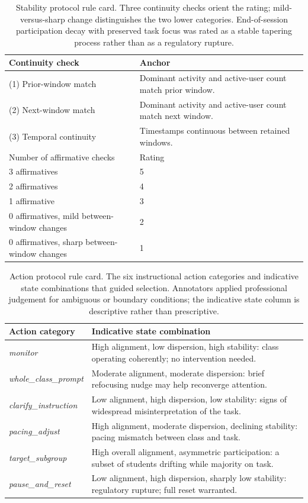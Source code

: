 \documentclass[preprint,12pt,authoryear]{elsarticle}
\begin{document}
\begin{table}[h]
\centering
\caption{Stability protocol rule card. Three continuity checks orient the rating; mild-versus-sharp change distinguishes the two lower categories. End-of-session participation decay with preserved task focus was rated as a stable tapering process rather than as a regulatory rupture.}
\label{tab:annot-stability}
\begin{tabular}{lp{8cm}}
\hline
Continuity check & Anchor \\
\hline
(1) Prior-window match & Dominant activity and active-user count match prior window. \\
(2) Next-window match & Dominant activity and active-user count match next window. \\
(3) Temporal continuity & Timestamps continuous between retained windows. \\
\hline
Number of affirmative checks & Rating \\
\hline
3 affirmatives & 5 \\
2 affirmatives & 4 \\
1 affirmative & 3 \\
0 affirmatives, mild between-window changes & 2 \\
0 affirmatives, sharp between-window changes & 1 \\
\hline
\end{tabular}
\end{table}

\begin{table}[h]
\centering
\caption{Action protocol rule card. The six instructional action categories and indicative state combinations that guided selection. Annotators applied professional judgement for ambiguous or boundary conditions; the indicative state column is descriptive rather than prescriptive.}
\label{tab:annot-action}
\begin{tabular}{lp{7cm}}
\hline
Action category & Indicative state combination \\
\hline
\textit{monitor} & High alignment, low dispersion, high stability: class operating coherently; no intervention needed. \\
\textit{whole\_class\_prompt} & Moderate alignment, moderate dispersion: brief refocusing nudge may help reconverge attention. \\
\textit{clarify\_instruction} & Low alignment, high dispersion, low stability: signs of widespread misinterpretation of the task. \\
\textit{pacing\_adjust} & High alignment, moderate dispersion, declining stability: pacing mismatch between class and task. \\
\textit{target\_subgroup} & High overall alignment, asymmetric participation: a subset of students drifting while majority on task. \\
\textit{pause\_and\_reset} & Low alignment, high dispersion, sharply low stability: regulatory rupture; full reset warranted. \\
\hline
\end{tabular}
\end{table}
\end{document}
